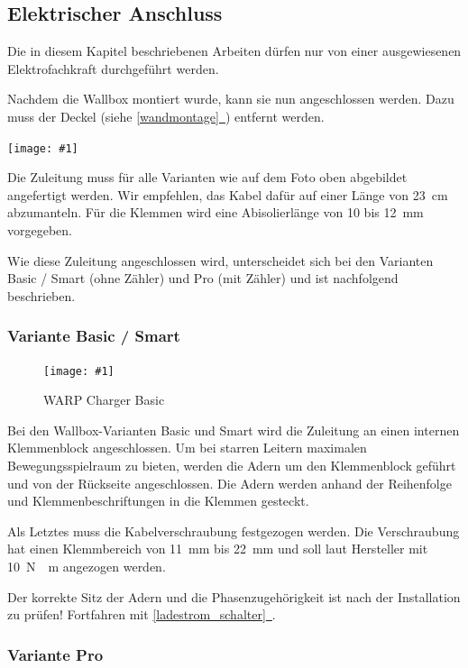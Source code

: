 \documentclass[a4paper,10pt]{article}
\newcommand{\hint}[1]{\begin{tcolorbox}[colback=boxgray,colframe=black,coltext=
white,title=Hinweis,left*=2mm,right*=2mm,boxsep=1mm,bottom=1mm,top=1mm]#1\end{tcolorbox}}
\newcommand{\gfx}[1]{\texttt{[image: \#1]}}
\newcommand*{\fullref}[1]{\hyperref[{#1}]{\ref*{#1}~\nameref*{#1}}}
\begin{document}
\begin{multicols*}{2}
	\newpage
	\subsection{Elektrischer Anschluss}
	\hint{Die in diesem Kapitel beschriebenen Arbeiten dürfen nur von einer ausgewiesenen
		Elektrofachkraft durchgeführt werden.}

	Nachdem die Wallbox montiert wurde, kann sie nun angeschlossen werden. Dazu
	muss der Deckel (siehe \fullref{wandmontage}) entfernt werden.

	\gfx{./img_warp2/resized/warp_cable_cut_ready}

	Die Zuleitung muss für alle Varianten wie auf dem Foto oben abgebildet
	angefertigt werden. Wir empfehlen, das Kabel dafür auf einer Länge von
	\SI{23}{\centi\meter} abzumanteln. Für die Klemmen wird eine
	Abisolierlänge von 10 bis \SI{12}{\milli\meter} vorgegeben.

	Wie diese Zuleitung angeschlossen wird, unterscheidet sich bei
	den Varianten Basic / Smart (ohne Zähler) und Pro (mit Zähler) und ist
	nachfolgend beschrieben.

	\subsubsection{Variante Basic / Smart}

	\begin{figure}[H]
		\gfx{./img_warp2/resized/warp2_basic_top_open}
		\caption*{WARP Charger Basic}
	\end{figure}

	Bei den Wallbox-Varianten Basic und Smart
	wird die Zuleitung an einen internen Klemmenblock
	angeschlossen. Um bei starren Leitern maximalen Bewegungsspielraum zu bieten,
	werden die Adern um den Klemmenblock geführt und von der Rückseite
	angeschlossen. Die Adern werden anhand der Reihenfolge und Klemmenbeschriftungen in die
	Klemmen gesteckt.

	Als Letztes muss die Kabelverschraubung festgezogen werden. Die Verschraubung
	hat einen Klemmbereich von \SI{11}{\milli\meter} bis \SI{22}{\milli\meter} und soll laut Hersteller mit
	\SI{10}{\newton{}\meter} angezogen werden.

	Der korrekte Sitz der Adern und die Phasenzugehörigkeit ist nach der
	Installation zu prüfen! Fortfahren mit \fullref{ladestrom_schalter}.


	\subsubsection{Variante Pro}


\end{multicols*}
\end{document}
